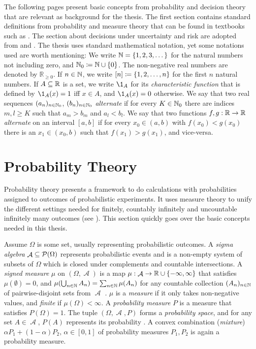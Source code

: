 \documentclass[a4paper,DIV=11]{scrreprt}
\DeclareMathOperator{\A}{\mathcal{A}}
\newcommand{\Rp}{\mathbb{R}_{\geq 0}}
\theoremstyle{definition}
\begin{document}
    The following pages present basic concepts from probability and decision theory that are relevant as background for the thesis.
    The first section contains standard definitions from probability and measure theory that can be found in textbooks such as \cite{bib:billingsleyProbabilityAndMeasure}.
    The section about decisions under uncertainty and risk are adopted from \cite[Sections 3.5 - 5.3]{bib:doersamGrundlagenDerEntscheidungstheorie} and \cite[Sections I.1, I.2]{bib:wakkerProspectTheory}.
    The thesis uses standard mathematical notation, yet some notations used are worth mentioning:
    We write $\mathbb{N} = \{1, 2, 3, \dots\}$ for the natural numbers not including zero, and $\mathbb{N}_0 \coloneqq \mathbb{N} \cup \{0\}$.
    The non-negative real numbers are denoted by $\Rp$. If $n \in \mathbb{N}$, we write $[n] \coloneqq \{1, 2, \dots, n\}$ for the first $n$ natural numbers.
    If $A \subseteq \mathbb{R}$ is a set, we write $\1_A$ for its \emph{characteristic function} that is defined by $\1_A(x) = 1$ iff $x \in A$, and $\1_A(x) = 0$ otherwise.
    We say that two real sequences $(a_n)_{n \in \mathbb{N}_0}$, $(b_n)_{n \in \mathbb{N}_0}$ \emph{alternate} if for every $K \in \mathbb{N}_0$ there are indices $m, l \geq K$ such that $a_m > b_m$ and $a_l < b_l$. We say that two functions $f, g: \mathbb{R} \to \mathbb{R}$ \emph{alternate} on an interval $[a, b]$ if for every $x_0 \in (a, b)$ with $f(x_0) < g(x_0)$ there is an $x_1 \in (x_0, b)$ such that $f(x_1) > g(x_1)$, and vice-versa.
    
    \section{Probability Theory}
    Probability theory presents a framework to do calculations with probabilities assigned to outcomes of probabilistic experiments. It uses measure theory to unify the different settings needed for finitely, countably infinitely and uncountable infinitely many outcomes (see \cite[Section 1]{bib:billingsleyProbabilityAndMeasure}). This section quickly goes over the basic concepts needed in this thesis.
    
    Assume $\Omega$ is some set, usually representing probabilistic outcomes. 
    A \emph{sigma algebra} $\A \subseteq \Pot(\Omega)$ represents probabilistic events and is a non-empty system of subsets of $\Omega$ which is closed under complements and countable intersections.
    A \emph{signed measure} $\mu$ on $(\Omega, \A)$ is a map $\mu: \A \to \R \cup \set{-\infty, \infty}$ that satisfies $\mu(\emptyset) = 0$, and $\mu(\bigcup_{n \in \mathbb{N}} A_n) = \sum_{n \in \mathbb{N}}\mu(A_n)$ for any countable collection $(A_n)_{n \in \mathbb{N}}$ of pairwise-disjoint sets from $\A$ \cite[Problem 32.12]{bib:billingsleyProbabilityAndMeasure}.
    $\mu$ is a \emph{measure} if it only takes non-negative values, and \emph{finite} if $\mu(\Omega) < \infty$.
    A \emph{probability measure} $P$ is a measure that satisfies $P(\Omega) = 1$.
    The tuple $(\Omega, \A, P)$ forms a \emph{probability space}, and for any set $A \in \A$, $P(A)$ represents its probability \cite[Section 2]{bib:billingsleyProbabilityAndMeasure}.
    A convex combination (\emph{mixture}) $\alpha P_1 + (1-\alpha) P_2,\, \alpha \in [0, 1]$ of probability measures $P_1, P_2$ is again a probability measure.
    
\end{document}
